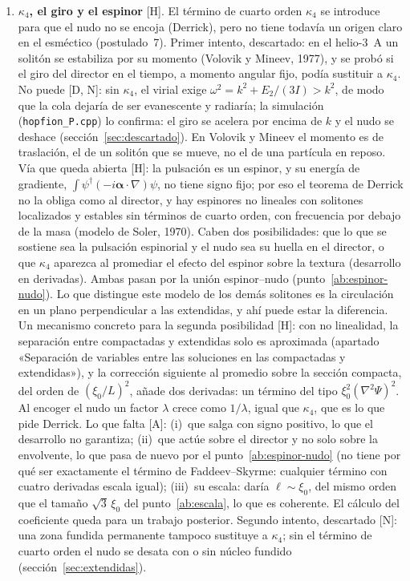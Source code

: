 \documentclass[11pt,a4paper]{article}
\newcommand{\st}[1]{\textup{[#1]}}
\newcommand{\vb}[1]{\symbf{#1}}
\newcommand{\prog}[1]{\texttt{#1}}
\begin{document}
\begin{enumerate}[label=\arabic*.,ref=\arabic*,leftmargin=*]
\item \label{ab:kappa4}\textbf{$\kappa_4$, el giro y el espinor} \st{H}. El término de cuarto orden $\kappa_4$ se introduce para que el nudo no se encoja (Derrick), pero no tiene todavía un origen claro en el esméctico (postulado~7). Primer intento, descartado: en el helio-3~A un solitón se estabiliza por su momento (Volovik y Mineev, 1977), y se probó si el giro del director en el tiempo, a momento angular fijo, podía sustituir a $\kappa_4$. No puede \st{D, N}: sin $\kappa_4$, el virial exige $\omega^2=k^2+E_2/(3I)>k^2$, de modo que la cola dejaría de ser evanescente y radiaría; la simulación (\prog{hopfion\_P.cpp}) lo confirma: el giro se acelera por encima de $k$ y el nudo se deshace (sección~\ref{sec:descartado}). En Volovik y Mineev el momento es de traslación, el de un solitón que se mueve, no el de una partícula en reposo. Vía que queda abierta \st{H}: la pulsación es un espinor, y su energía de gradiente, $\int\psi^\dagger(-i\vb{\alpha}\cdot\nabla)\psi$, no tiene signo fijo; por eso el teorema de Derrick no la obliga como al director, y hay espinores no lineales con solitones localizados y estables sin términos de cuarto orden, con frecuencia por debajo de la masa (modelo de Soler, 1970). Caben dos posibilidades: que lo que se sostiene sea la pulsación espinorial y el nudo sea su huella en el director, o que $\kappa_4$ aparezca al promediar el efecto del espinor sobre la textura (desarrollo en derivadas). Ambas pasan por la unión espinor--nudo (punto~\ref{ab:espinor-nudo}). Lo que distingue este modelo de los demás solitones es la circulación en un plano perpendicular a las extendidas, y ahí puede estar la diferencia. Un mecanismo concreto para la segunda posibilidad \st{H}: con no linealidad, la separación entre compactadas y extendidas solo es aproximada (apartado «Separación de variables entre las soluciones en las compactadas y extendidas»), y la corrección siguiente al promedio sobre la sección compacta, del orden de $(\xi_0/L)^2$, añade dos derivadas: un término del tipo $\xi_0^2(\nabla^2\Psi)^2$. Al encoger el nudo un factor $\lambda$ crece como $1/\lambda$, igual que $\kappa_4$, que es lo que pide Derrick. Lo que falta \st{A}: (i)~que salga con signo positivo, lo que el desarrollo no garantiza; (ii)~que actúe sobre el director y no solo sobre la envolvente, lo que pasa de nuevo por el punto~\ref{ab:espinor-nudo} (no tiene por qué ser exactamente el término de Faddeev--Skyrme: cualquier término con cuatro derivadas escala igual); (iii)~su escala: daría $\ell\sim\xi_0$, del mismo orden que el tamaño $\sqrt3\,\xi_0$ del punto~\ref{ab:escala}, lo que es coherente. El cálculo del coeficiente queda para un trabajo posterior. Segundo intento, descartado \st{N}: una zona fundida permanente tampoco sustituye a $\kappa_4$; sin el término de cuarto orden el nudo se desata con o sin núcleo fundido (sección~\ref{sec:extendidas}).



\end{enumerate}
\end{document}

